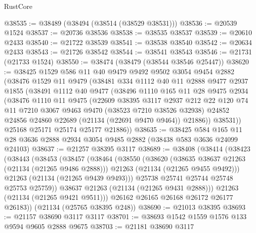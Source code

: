 \begin{lexlean}{RustCore}
\begin{coremodule}
@38535 := @38489 (@38494 (@38514 (@38529 @38531)))
@38536 := @20539 @1524
@38537 := @20736 @38536
@38538 := @38535 @38537
@38539 := @20610 @2433
@38540 := @21722 @38539
@38541 := @38538 @38540
@38542 := @20634 @2433
@38543 := @21726 @38542
@38544 := @38541 @38543
@38546 := @21731 (@21733 @1524)
@38550 := @38474 (@38479 (@38544 @38546 @25447))
@38620 := @38425
    @1529
    @586
    @11
    @40
    @9479
    @9492
    @9502
    @3054
    @9454
    @2882
    (@38476
      @1529
      @11
      @9479
      (@38481
        @334
        @1112
        @40
        @11
        @2888
        @9477
        @2937
        @1855
        (@38491
          @1112
          @40
          @9477
          (@38496
            @1110
            @165
            @11
            @28
            @9475
            @2934
            (@38476
              @1110
              @11
              @9475
              (@22609
                @38395
                @3117
                @2937
                @212
                @22
                @120
                @74
                @11
                @7210
                @3067
                @9463
                @9470
                (@38523 @7210 @38526 @32938)
                @24852
                @24856
                @24860
                @22689
                (@21134 (@22691 @9470 @9464))
                @21886))
            @38531))
        @25168
        @25171
        @25174
        @25177
        @21886))
@38635 := @38425
    @584
    @165
    @11
    @28
    @3636
    @2888
    @2934
    @3054
    @9485
    @2882
    (@38438 @583 @3636 @24099 @24103)
@38637 := @21257 @38395 @3117
@38689 := @38408
    (@38414
      (@38423
        (@38443
          (@38453
            (@38457
              (@38464
                (@38550
                  (@38620
                    (@38635 @38637 @21263 (@21134 (@21265 @9486 @2888)))
                    @21263
                    (@21134 (@21265 @9455 @9492)))
                  @21263
                  (@21134 (@21265 @9439 @9493)))
                @25738
                @25741
                @25744
                @25748
                @25753
                @25759))
            @38637
            @21263
            (@21134 (@21265 @9431 @2888)))
          @21263
          (@21134 (@21265 @9421 @9511)))
        @26162
        @26165
        @26168
        @26172
        @26177
        @26183))
    (@21134 (@25765 @38395 @248))
@38690 := @21013 @38395
@38693 := @21157 @38690 @3117 @3117
@38701 := @38693 @1542 @1559 @1576 @133 @9594 @9605 @2888 @9675
@38703 := @21181 @38690 @3117

\end{coremodule}
\end{lexlean}
